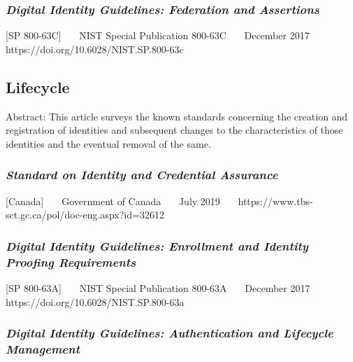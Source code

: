 \hypertarget{digital-identity-guidelines-federation-and-assertions}{%
\subsubsection{\texorpdfstring{\emph{Digital Identity Guidelines: Federation
and
Assertions}}{Digital Identity Guidelines: Federation and Assertions}}\label{digital-identity-guidelines-federation-and-assertions}}

{[}SP 800-63C{]}~~~ NIST Special Publication 800-63C~~~ December 2017~~~
https://doi.org/10.6028/NIST.SP.800-63c~~~

\hypertarget{lifecycle}{%
\subsection{Lifecycle}\label{lifecycle}}

Abstract: This article surveys the known standards concerning the
creation and registration of identities and subsequent changes to the
characteristics of those identities and the eventual removal of the
same.

\hypertarget{standard-on-identity-and-credential-assurance}{%
\subsubsection{\texorpdfstring{\emph{Standard on Identity and Credential
Assurance}}{Standard on Identity and Credential Assurance}}\label{standard-on-identity-and-credential-assurance}}

{[}Canada{]}~~~ Government of Canada~~~ July 2019~~~
https://www.tbs-sct.gc.ca/pol/doc-eng.aspx?id=32612

\hypertarget{digital-identity-guidelines-enrollment-and-identity-proofing-requirements}{%
\subsubsection{\texorpdfstring{\emph{Digital Identity Guidelines: Enrollment
and Identity Proofing
Requirements}}{Digital Identity Guidelines: Enrollment and Identity Proofing Requirements}}\label{digital-identity-guidelines-enrollment-and-identity-proofing-requirements}}

{[}SP 800-63A{]}~~~ NIST Special Publication 800-63A~~~ December 2017~~~
https://doi.org/10.6028/NIST.SP.800-63a~~~

\hypertarget{digital-identity-guidelines-authentication-and-lifecycle-management-1}{%
\subsubsection{\texorpdfstring{\emph{Digital Identity Guidelines:
Authentication and Lifecycle
Management}}{Digital Identity Guidelines: Authentication and Lifecycle Management}}\label{digital-identity-guidelines-authentication-and-lifecycle-management-1}}

